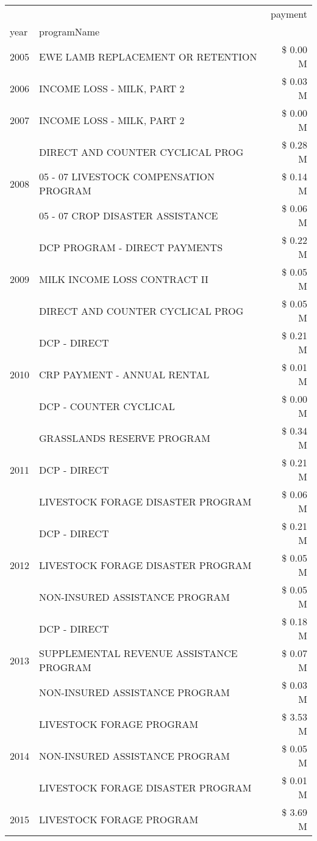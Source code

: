 \begin{tabular}{llr}
\toprule
 &  & payment \\
year & programName &  \\
\midrule
2005 & EWE LAMB REPLACEMENT OR RETENTION & \$ 0.00 M \\
\cline{1-3}
2006 & INCOME LOSS - MILK, PART 2 & \$ 0.03 M \\
\cline{1-3}
2007 & INCOME LOSS - MILK, PART 2 & \$ 0.00 M \\
\cline{1-3}
\multirow[t]{3}{*}{2008} & DIRECT AND COUNTER CYCLICAL PROG & \$ 0.28 M \\
 & 05 - 07 LIVESTOCK COMPENSATION PROGRAM & \$ 0.14 M \\
 & 05 - 07 CROP DISASTER ASSISTANCE & \$ 0.06 M \\
\cline{1-3}
\multirow[t]{3}{*}{2009} & DCP PROGRAM - DIRECT PAYMENTS & \$ 0.22 M \\
 & MILK INCOME LOSS CONTRACT II & \$ 0.05 M \\
 & DIRECT AND COUNTER CYCLICAL PROG & \$ 0.05 M \\
\cline{1-3}
\multirow[t]{3}{*}{2010} & DCP - DIRECT & \$ 0.21 M \\
 & CRP PAYMENT - ANNUAL RENTAL & \$ 0.01 M \\
 & DCP - COUNTER CYCLICAL & \$ 0.00 M \\
\cline{1-3}
\multirow[t]{3}{*}{2011} & GRASSLANDS RESERVE PROGRAM & \$ 0.34 M \\
 & DCP - DIRECT & \$ 0.21 M \\
 & LIVESTOCK FORAGE DISASTER PROGRAM & \$ 0.06 M \\
\cline{1-3}
\multirow[t]{3}{*}{2012} & DCP - DIRECT & \$ 0.21 M \\
 & LIVESTOCK FORAGE DISASTER PROGRAM & \$ 0.05 M \\
 & NON-INSURED ASSISTANCE PROGRAM & \$ 0.05 M \\
\cline{1-3}
\multirow[t]{3}{*}{2013} & DCP - DIRECT & \$ 0.18 M \\
 & SUPPLEMENTAL REVENUE ASSISTANCE PROGRAM & \$ 0.07 M \\
 & NON-INSURED ASSISTANCE PROGRAM & \$ 0.03 M \\
\cline{1-3}
\multirow[t]{3}{*}{2014} & LIVESTOCK FORAGE PROGRAM & \$ 3.53 M \\
 & NON-INSURED ASSISTANCE PROGRAM & \$ 0.05 M \\
 & LIVESTOCK FORAGE DISASTER PROGRAM & \$ 0.01 M \\
\cline{1-3}
\multirow[t]{3}{*}{2015} & LIVESTOCK FORAGE PROGRAM & \$ 3.69 M \\

\end{tabular}
